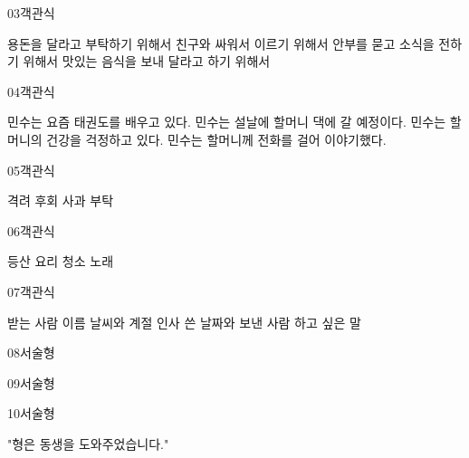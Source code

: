\documentclass[fs13,seriesSau]{korfarm-base}
\begin{document}
\begin{kfQBlock}{03}{객관식}
\begin{kfChoices}
\kfChoice 용돈을 달라고 부탁하기 위해서
\kfChoice 친구와 싸워서 이르기 위해서
\kfChoice 안부를 묻고 소식을 전하기 위해서
\kfChoice 맛있는 음식을 보내 달라고 하기 위해서
\end{kfChoices}
\end{kfQBlock}

\begin{kfQBlock}{04}{객관식}
\begin{kfChoices}
\kfChoice 민수는 요즘 태권도를 배우고 있다.
\kfChoice 민수는 설날에 할머니 댁에 갈 예정이다.
\kfChoice 민수는 할머니의 건강을 걱정하고 있다.
\kfChoice 민수는 할머니께 전화를 걸어 이야기했다.
\end{kfChoices}
\end{kfQBlock}

\begin{kfQBlock}{05}{객관식}
\begin{kfChoices}
\kfChoice 격려
\kfChoice 후회
\kfChoice 사과
\kfChoice 부탁
\end{kfChoices}
\end{kfQBlock}

\begin{kfQBlock}{06}{객관식}
\begin{kfChoices}
\kfChoice 등산
\kfChoice 요리
\kfChoice 청소
\kfChoice 노래
\end{kfChoices}
\end{kfQBlock}

\begin{kfQBlock}{07}{객관식}
\begin{kfChoices}
\kfChoice 받는 사람 이름
\kfChoice 날씨와 계절 인사
\kfChoice 쓴 날짜와 보낸 사람
\kfChoice 하고 싶은 말
\end{kfChoices}
\end{kfQBlock}

\begin{kfQBlock}{08}{서술형}
\end{kfQBlock}

\begin{kfQBlock}{09}{서술형}
\end{kfQBlock}

\begin{kfQBlock}{10}{서술형}
\begin{kfEvidence}"형은 동생을 도와주었습니다."\end{kfEvidence}
\end{kfQBlock}
\end{document}
